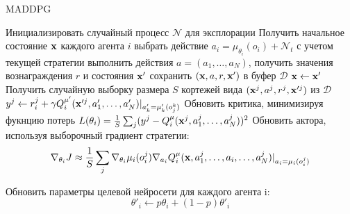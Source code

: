 \documentclass[12pt, a4paper]{extarticle}
\theoremstyle{definition}
\begin{document}
\begin{algorithm}

\caption{MADDPG \cite{lowe2017multiagent}}
\begin{algorithmic}[1]
\State Инициализировать случайный процесс $\mathcal{N}$ для эксплорации
\State Получить начальное состояние $\bold{x}$
 каждого агента $i$ выбрать действие $a_i=\mu_{\theta_i}(o_i) + \mathcal{N}_t$ с учетом текущей стратегии
\State выполнить действия $a = (a_1, \ldots, a_N)$, получить значения вознаграждения $r$ и состояния $\bold{x}'$
\State сохранить $(\bold{x}, a, r, \bold{x}')$ в буфер $\mathcal{D}$
\State $\bold{x}\gets \bold{x}'$
\State Получить случайную выборку размера $S$ кортежей вида $(\bold{x}^j,a^j,r^j,\bold{x}'^j)$ из $\mathcal{D}$
\State $y^j \gets r^{j}_i+\gamma Q^{\mu'}_i(\bold{x}'^j,a'_1,\ldots,a'_N)\rvert_{a'_k=\mu'_k(o^k_j)}$
\State Обновить критика, минимизируя фукнцию потерь $L(\theta_i)=\frac{1}{S}\sum_j(y^j-Q^{\mu}_i(\bold{x}^j,a^j_1,\ldots,a^j_N))^2$
\State Обновить актора, используя выборочный градиент стратегии:
\begin{equation}
    \nabla_{\theta_i}J\approx \frac{1}{S}\sum_j\nabla_{\theta_i}\mu_i(o^j_i)\nabla_{a_i}Q^{\mu}_i(\bold{x},a^j_1,\ldots,a_i,\ldots, a^j_N)\rvert_{a_i=\mu_i(o^j_i)} \nonumber
\end{equation}

\EndFor
\State Обновить параметры целевой нейросети для каждого агента i:
\begin{equation}
    \theta'_i \gets p\theta_i + (1-p)\theta'_i \nonumber
\end{equation}
\EndFor
\EndFor
\end{algorithmic}
\end{algorithm}
\end{document}
